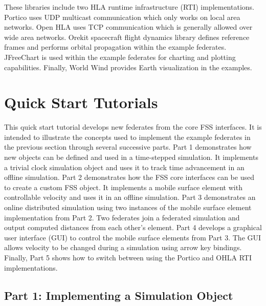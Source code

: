 \documentclass[]{article}
\begin{document}
These libraries include two HLA runtime infrastructure (RTI) implementations. Portico uses UDP multicast communication which only works on local area networks. %
Open HLA uses TCP communication which is generally allowed over wide area networks. %
Orekit spacecraft flight dynamics library defines reference frames and performs orbital propagation within the example federates. %
JFreeChart is used within the example federates for charting and plotting capabilities. Finally, World Wind provides Earth visualization in the examples. %

\section{Quick Start Tutorials}

This quick start tutorial develops new federates from the core FSS interfaces. It is intended to illustrate the concepts used to implement the example federates in the previous section through several successive parts. Part 1 demonstrates how new objects can be defined and used in a time-stepped simulation. It implements a trivial clock simulation object and uses it to track time advancement in an offline simulation. Part 2 demonstrates how the FSS core interfaces can be used to create a custom FSS object. It implements a mobile surface element with controllable velocity and uses it in an offline simulation. Part 3 demonstrates an online distributed simulation using two instances of the mobile surface element implementation from Part 2. Two federates join a federated simulation and output computed distances from each other's element. Part 4 develops a graphical user interface (GUI) to control the mobile surface elements from Part 3. The GUI allows velocity to be changed during a simulation using arrow key bindings. Finally, Part 5 shows how to switch between using the Portico and OHLA RTI implementations.

\subsection{Part 1: Implementing a Simulation Object}
\end{document}
